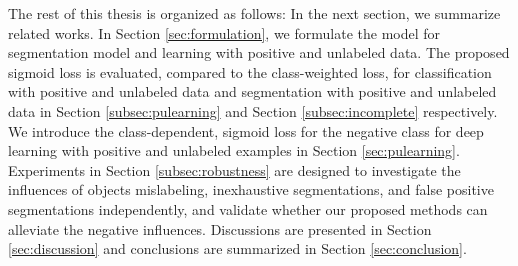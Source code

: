 
The rest of this thesis is organized as follows:
In the next section, we summarize related works.
In Section \ref{sec:formulation}, we formulate the model for segmentation model and learning with positive and unlabeled data.
The proposed sigmoid loss is evaluated, compared to the class-weighted loss, for classification with positive and unlabeled data and segmentation with positive and unlabeled data in Section \ref{subsec:pulearning} and Section \ref{subsec:incomplete} respectively.
We introduce the class-dependent, sigmoid loss for the negative class for deep learning with positive and unlabeled examples in Section \ref{sec:pulearning}.
Experiments in Section \ref{subsec:robustness} are designed to investigate the influences of objects mislabeling, inexhaustive segmentations, and false positive segmentations independently, and validate whether our proposed methods can alleviate the negative influences.
Discussions are presented in Section \ref{sec:discussion} and conclusions are summarized in Section \ref{sec:conclusion}.
